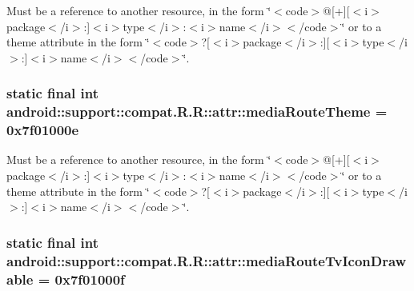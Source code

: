 Must be a reference to another resource, in the form \char`\"{}$<$code$>$@\mbox{[}+\mbox{]}\mbox{[}$<$i$>$package$<$/i$>$:\mbox{]}$<$i$>$type$<$/i$>$:$<$i$>$name$<$/i$>$$<$/code$>$\char`\"{} or to a theme attribute in the form \char`\"{}$<$code$>$?\mbox{[}$<$i$>$package$<$/i$>$:\mbox{]}\mbox{[}$<$i$>$type$<$/i$>$:\mbox{]}$<$i$>$name$<$/i$>$$<$/code$>$\char`\"{}. \hypertarget{classandroid_1_1support_1_1compat_1_1_r_1_1attr_97e82d3e34efac871c230934614b40e4}{
\subsubsection[{mediaRouteTheme}]{\setlength{\rightskip}{0pt plus 5cm}static final int android::support::compat.R.R::attr::mediaRouteTheme = 0x7f01000e}}
\label{classandroid_1_1support_1_1compat_1_1_r_1_1attr_97e82d3e34efac871c230934614b40e4}


Must be a reference to another resource, in the form \char`\"{}$<$code$>$@\mbox{[}+\mbox{]}\mbox{[}$<$i$>$package$<$/i$>$:\mbox{]}$<$i$>$type$<$/i$>$:$<$i$>$name$<$/i$>$$<$/code$>$\char`\"{} or to a theme attribute in the form \char`\"{}$<$code$>$?\mbox{[}$<$i$>$package$<$/i$>$:\mbox{]}\mbox{[}$<$i$>$type$<$/i$>$:\mbox{]}$<$i$>$name$<$/i$>$$<$/code$>$\char`\"{}. \hypertarget{classandroid_1_1support_1_1compat_1_1_r_1_1attr_193f44c16dcaefa3bf2b7a24d2956b91}{
\subsubsection[{mediaRouteTvIconDrawable}]{\setlength{\rightskip}{0pt plus 5cm}static final int android::support::compat.R.R::attr::mediaRouteTvIconDrawable = 0x7f01000f}}
\label{classandroid_1_1support_1_1compat_1_1_r_1_1attr_193f44c16dcaefa3bf2b7a24d2956b91}


